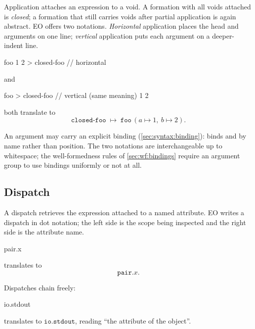 Application attaches an expression to a void.
A formation with all voids attached is \emph{closed}; a formation that
  still carries voids after partial application is again abstract.
EO offers two notations.
\emph{Horizontal} application places the head and arguments on one line;
  \emph{vertical} application puts each argument on a deeper-indent line.

\begin{ffcode}
foo 1 2 > closed-foo            // horizontal
\end{ffcode}

and

\begin{ffcode}
foo > closed-foo                // vertical (same meaning)
  1
  2
\end{ffcode}

both translate to
\begin{equation*}
  \mathtt{closed\text{-}foo}\;\mapsto\;
    \mathtt{foo}\,(a \mapsto 1,\ b \mapsto 2).
\end{equation*}

An argument may carry an explicit binding (\cref{sec:syntax:binding}):
   binds  and  by name rather than position.
The two notations are interchangeable up to whitespace;
  the well-formedness rules of \cref{sec:wf:bindings} require an argument
  group to use bindings uniformly or not at all.

\subsection{Dispatch}\label{sec:over:dispatch}

A dispatch retrieves the expression attached to a named attribute.
EO writes a dispatch in dot notation; the left side is the scope being
  inspected and the right side is the attribute name.

\begin{ffcode}
pair.x
\end{ffcode}

translates to
\begin{equation*}
  \mathtt{pair}.x.
\end{equation*}

Dispatches chain freely:
\begin{ffcode}
io.stdout
\end{ffcode}

translates to \(\mathtt{io}.\mathtt{stdout}\),
  reading \enquote{the  attribute of the  object}.

